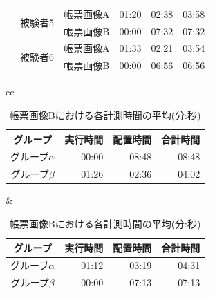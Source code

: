 \begin{table}[t]
\begin{tabular}{ccc||rrr}
                                    & \multirow{2}{*}{被験者5} & 帳票画像A & 01:20 & 02:38 & 03:58 \\ %
                                                            & & 帳票画像B & 00:00 & 07:32 & 07:32 \\ 
                                                            
                                    & \multirow{2}{*}{被験者6} & 帳票画像A & 01:33 & 02:21 & 03:54 \\
                                                            & & 帳票画像B & 00:00 & 06:56 & 06:56 \\ 

    \end{tabular}
\end{table}

\begin{table}[t]
	\centering
    \begin{tabular}{cc}
        \begin{minipage}[c]{0.5\hsize}
            \centering
            \caption{帳票画像Aにおける各計測時間の平均(分:秒)}
            \label{tb:result_imageA_mean_time}
            \begin{tabular}{c|rrr}
                グループ & 実行時間 & 配置時間 & 合計時間 \\
                \hline \hline
                グループ$\alpha$ & 00:00 & 08:48 & 08:48 \\
                グループ$\beta$ & 01:26 & 02:36 & 04:02 \\
	        \end{tabular}
        \end{minipage} &
        \begin{minipage}[c]{0.5\hsize}
            \centering
            \caption{帳票画像Bにおける各計測時間の平均(分:秒)}
            \label{tb:result_imageB_mean_time}
            \begin{tabular}{c|rrr}
                グループ & 実行時間 & 配置時間 & 合計時間 \\
                \hline \hline
                グループ$\alpha$ & 01:12 & 03:19 & 04:31 \\
                グループ$\beta$ & 00:00 & 07:13 & 07:13 \\
            \end{tabular}
        \end{minipage}
    \end{tabular}
\end{table}

